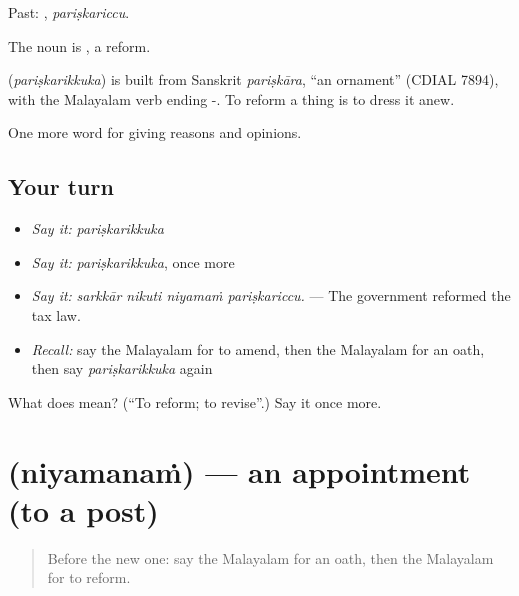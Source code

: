 Past: , \emph{pariṣkariccu}.

The noun is , a reform.

\begin{cousinweb}
\textbf{} (\emph{pariṣkarikkuka}) is built from Sanskrit \emph{pariṣkāra}, \textquotedblleft{}an ornament\textquotedblright{} (CDIAL 7894), with the Malayalam verb ending -. To reform a thing is to dress it anew.
\end{cousinweb}

\begin{grammarlens}[title={What you've built}]
One more word for giving reasons and opinions.
\end{grammarlens}

\subsection*{Your turn}
\begin{itemize}
\raggedright
  \item \emph{Say it:} \emph{pariṣkarikkuka}
  \item \emph{Say it:} \emph{pariṣkarikkuka}, once more
  \item \emph{Say it:} \emph{sarkkār nikuti niyamaṁ pariṣkariccu.} — The government reformed the tax law.
  \item \emph{Recall:} say the Malayalam for to amend, then the Malayalam for an oath, then say \emph{pariṣkarikkuka} again
\end{itemize}

\begin{tcolorbox}[breakable,colback=teal!4,colframe=teal!35!black,title={Before you move on}]
What does  mean? (\textquotedblleft{}To reform; to revise\textquotedblright{}.) Say it once more.
\end{tcolorbox}
\section[\texorpdfstring{\ml{നിയമനം} (niyamanaṁ)}{നിയമനം (niyamanaṁ)}]{ (niyamanaṁ) — an appointment (to a post)}

\label{lesson:ML-C424-niyamanam}



\begin{quote}
Before the new one: say the Malayalam for an oath, then the Malayalam for to reform.
\end{quote}

